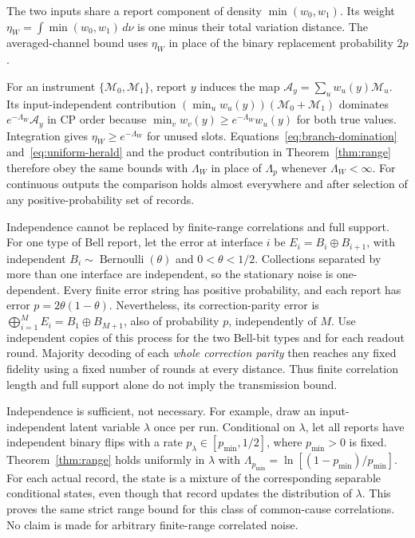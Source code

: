 \documentclass[aps,prl,twocolumn,superscriptaddress,longbibliography,reprint,floatfix]{revtex4-2}
\begin{document}
The two inputs share a report component of density $\min(w_0,w_1)$.
Its weight $\eta_W=\int\min(w_0,w_1)\,d\nu$ is one minus their total
variation distance. The averaged-channel bound uses $\eta_W$ in place of
the binary replacement probability $2p$.

For an instrument $\{\mathcal M_0,\mathcal M_1\}$, report $y$ induces the
map $\mathcal A_y=\sum_u w_u(y)\mathcal M_u$. Its input-independent
contribution $(\min_u w_u(y))(\mathcal M_0+\mathcal M_1)$ dominates
$e^{-\Lambda_W}\mathcal A_y$ in CP order because
$\min_v w_v(y)\ge e^{-\Lambda_W}w_u(y)$ for both true values.
Integration gives $\eta_W\ge e^{-\Lambda_W}$ for unused slots.
Equations~\eqref{eq:branch-domination} and~\eqref{eq:uniform-herald}
and the product contribution in Theorem~\ref{thm:range} therefore obey
the same bounds with $\Lambda_W$ in place of $\Lambda_p$ whenever
$\Lambda_W<\infty$. For continuous outputs the comparison holds almost
everywhere and after selection of any positive-probability set of records.

Independence cannot be replaced by finite-range correlations and full
support. For one type of Bell report, let the error at interface $i$ be
$E_i=B_i\oplus B_{i+1}$, with independent
$B_i\sim\operatorname{Bernoulli}(\theta)$ and $0<\theta<1/2$.
Collections separated by more than one interface are independent,
so the stationary noise is one-dependent. Every finite error string has positive
probability, and each report has error $p=2\theta(1-\theta)$.
Nevertheless, its correction-parity error is
$\bigoplus_{i=1}^M E_i=B_1\oplus B_{M+1}$, also of probability $p$,
independently of $M$. Use independent copies of this process for the two
Bell-bit types and for each readout round. Majority decoding of each
\emph{whole correction parity} then reaches any fixed fidelity using a
fixed number of rounds at every distance. Thus finite correlation length
and full support alone do not imply the transmission bound.

Independence is sufficient, not necessary. For example, draw an
input-independent latent variable $\lambda$ once per run. Conditional on
$\lambda$, let all reports have independent binary flips with a rate
$p_\lambda\in[p_{\min},1/2]$, where $p_{\min}>0$ is fixed.
Theorem~\ref{thm:range} holds uniformly in $\lambda$ with
$\Lambda_{p_{\min}}=\ln[(1-p_{\min})/p_{\min}]$. For each actual record, the state is a
mixture of the corresponding separable conditional states, even though
that record updates the distribution of $\lambda$. This proves the same
strict range bound for this class of common-cause correlations. No claim
is made for arbitrary finite-range correlated noise.
\end{document}
